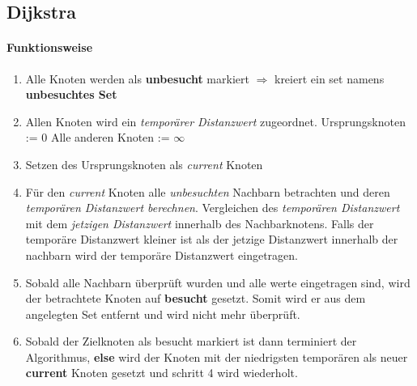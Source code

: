 \subsection{Dijkstra}
\paragraph{Funktionsweise}
\begin{enumerate}
	\item Alle Knoten werden als \textbf{unbesucht} markiert $\Rightarrow$ kreiert ein set namens \textbf{unbesuchtes Set}
	\item Allen Knoten wird ein \textit{temporärer Distanzwert} zugeordnet.
	\subitem Ursprungsknoten := 0
	\subitem Alle anderen Knoten := $\infty$
	\item Setzen des Ursprungsknoten als \textit{current} Knoten
	\item Für den \textit{current} Knoten alle \textit{unbesuchten} Nachbarn betrachten und deren \textit{temporären Distanzwert berechnen}.
	Vergleichen des \textit{temporären Distanzwert} mit dem \textit{jetzigen Distanzwert} innerhalb des Nachbarknotens.
	Falls der temporäre Distanzwert kleiner ist als der jetzige Distanzwert innerhalb der nachbarn wird der temporäre Distanzwert eingetragen.
	\item Sobald alle Nachbarn überprüft wurden und alle werte eingetragen sind, wird der betrachtete Knoten auf \textbf{besucht} gesetzt. Somit wird er aus dem angelegten Set entfernt und wird nicht mehr überprüft.
	\item Sobald der Zielknoten als besucht markiert ist dann terminiert der Algorithmus, \textbf{else} wird der Knoten mit der niedrigsten temporären als neuer \textbf{current} Knoten gesetzt und schritt 4 wird wiederholt.
\end{enumerate}

